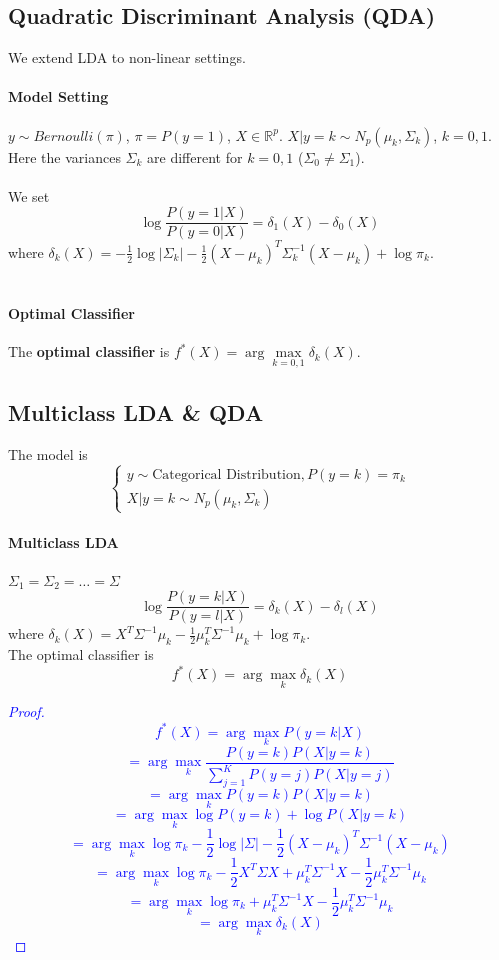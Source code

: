 \documentclass[12pt]{book}
\theoremstyle{definition}
\theoremstyle{remark}
\newcommand{\R}{\mathbb{R}}
\begin{document}
\subsection{Quadratic Discriminant Analysis (QDA)}
We extend LDA to non-linear settings.
\paragraph{Model Setting}
$y \sim Bernoulli(\pi)$, $\pi = P(y = 1)$, $X \in \R^p$. $X|y = k \sim N_p(\mu_k, \Sigma_k)$, $k = 0,1$. Here the variances $\Sigma_k$ are different for $k = 0,1$ ($\Sigma_0 \ne \Sigma_1$).\\
\\
We set \[\log \frac{P(y = 1|X)}{P(y = 0|X)} = \delta_1(X) - \delta_0(X)\] where $\delta_k(X) = -\frac12\log|\Sigma_k| - \frac12(X-\mu_k)^T\Sigma_k^{-1}(X-\mu_k)+\log\pi_k$.\\
\\
\paragraph{Optimal Classifier}
The \textbf{optimal classifier} is $f^*(X)= \arg\underset{k = 0,1}{\max}\delta_k(X)$.\\


\subsection{Multiclass LDA \& QDA}
The model is 
\[\begin{cases}y \sim \text{Categorical Distribution}, P(y = k) = \pi_k
 \\X|y = k \sim N_p(\mu_k,\Sigma_k)
\end{cases}\]
\paragraph{Multiclass LDA}
$\Sigma_1 = \Sigma_2 = \dots = \Sigma$\\
\[\log \frac{P(y = k|X)}{P(y = l|X)} = \delta_k(X) - \delta_l(X) \]
where $\delta_k(X) = X^T\Sigma^{-1}\mu_k - \frac12 \mu_k^T\Sigma^{-1}\mu_k+\log\pi_k$.\\
The optimal classifier is \[f^*(X) = \arg\underset{k}{\max}\delta_k(X)\]
\textcolor{blue}{
\begin{proof}
    \[f^*(X) = \arg\underset{k}{\max} P(y = k|X) \]\[= \arg\underset{k}{\max}\frac{P(y = k)P(X|y=k)}{\sum_{j=1}^K P(y = j)P(X|y=j)}\]
    \[ = \arg\underset{k}{\max}P(y = k)P(X|y=k)\]
    \[= \arg\underset{k}{\max}\log P(y = k)+\log P(X|y=k)\]
    \[ = \arg\underset{k}{\max}\log \pi_k - \frac{1}{2}\log |\Sigma| - \frac12 (X-\mu_k)^T\Sigma^{-1}(X-\mu_k)\]
    \[ = \arg\underset{k}{\max}\log \pi_k  - \frac12 X^T\Sigma X+\mu_k^T\Sigma^{-1}X - \frac12\mu_k^T\Sigma^{-1}\mu_k\]
    \[ = \arg\underset{k}{\max}\log \pi_k + \mu_k^T\Sigma^{-1}X - \frac12\mu_k^T\Sigma^{-1}\mu_k\]
    \[ = \arg\underset{k}{\max} \delta_k(X)\]
\end{proof}
}
\end{document}
